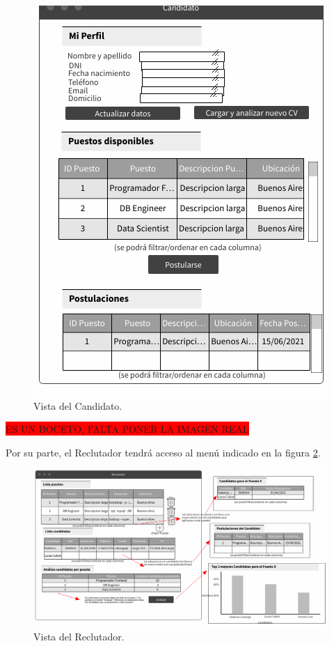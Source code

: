 \documentclass[12pt,a4paper]{article}
\begin{document}
\begin{figure}[H]    %
  \centering
  \includegraphics[width=1\textwidth]{images/Vista_Candidato.png}
  \caption{Vista del Candidato.}  
  \label{fig:Vista_Candidato}
\end{figure}

\colorbox{red}{ES UN BOCETO, FALTA PONER LA IMAGEN REAL}

Por su parte, el Reclutador tendrá acceso al menú indicado en la figura \ref{fig:Vista_Reclutador}. 

\begin{figure}[H]    %
  \centering
  \includegraphics[width=1\textwidth]{images/Vista_Reclutador.png}
  \caption{Vista del Reclutador.}  
  \label{fig:Vista_Reclutador}
\end{figure}
\end{document}
